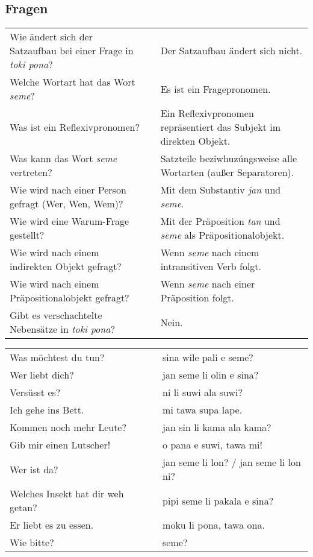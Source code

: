 \newpage
%
\subsection*{Fragen} 
\label{'questions_using_seme'}

\begin{supertabular}{p{5,5cm}|ll}
Wie ändert sich der Satzaufbau bei einer Frage in \textit{toki pona}? && Der Satzaufbau ändert sich nicht. \\ %
Welche Wortart hat das Wort \textit{seme}? && Es ist ein Fragepronomen.  \\ %
Was ist ein Reflexivpronomen? && Ein Reflexivpronomen repräsentiert das Subjekt im direkten Objekt. \\ %
Was kann das Wort \textit{seme} vertreten? && Satzteile beziwhuzúngsweise alle Wortarten (außer Separatoren).  \\ %
Wie wird nach einer Person gefragt (Wer, Wen, Wem)? && Mit dem Substantiv \textit{jan} und \textit{seme}. \\ %
Wie wird eine Warum-Frage gestellt? && Mit der Präposition \textit{tan} und \textit{seme} als Präpositionalobjekt. \\ %
Wie wird nach einem indirekten Objekt gefragt? && Wenn \textit{seme} nach einem intransitiven Verb folgt. \\ %
Wie wird nach einem Präpositionalobjekt gefragt? && Wenn \textit{seme} nach einer Präposition folgt. \\ %
Gibt es verschachtelte Nebensätze in \textit{toki pona}? &&  Nein. \\ %
\end{supertabular}

\begin{supertabular}{p{5,5cm}|ll}
Was möchtest du tun?  && sina wile pali e seme? \\ %
Wer liebt dich?  && jan seme li olin e sina? \\ %
Versüsst es? && ni li suwi ala suwi? \\ %
Ich gehe ins Bett.  && mi tawa supa lape. \\ %
Kommen noch mehr Leute?  && jan sin li kama ala kama? \\ %
Gib mir einen Lutscher!  && o pana e suwi, tawa mi! \\ %
Wer ist da?  && jan seme li lon? / jan seme li lon ni? \\ %
Welches Insekt hat dir weh getan?  && pipi seme li pakala e sina? \\ %
Er liebt es zu essen.  && moku li pona, tawa ona. \\ %
Wie bitte? && seme?  \\ %
\end{supertabular}  

